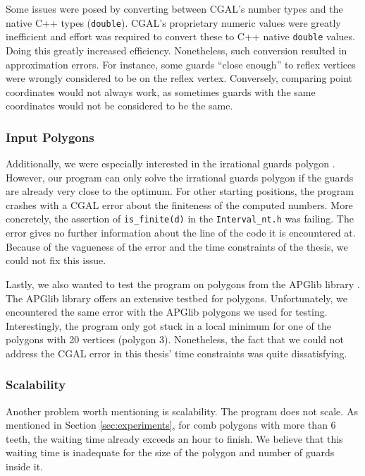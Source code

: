 Some issues were posed by converting between CGAL's number types and the native C++ types (\texttt{double}). CGAL's proprietary numeric values were greatly inefficient and effort was required to convert these to C++ native \texttt{double} values. Doing this greatly increased efficiency.
Nonetheless, such conversion resulted in approximation errors. For instance, some guards ``close enough'' to reflex vertices were wrongly considered to be on the reflex vertex. Conversely, comparing point coordinates would not always work, as sometimes guards with the same coordinates would not be considered to be the same.

\subsubsection*{Input Polygons}
Additionally, we were especially interested in the irrational guards polygon \cite{abrahamsen2021art}. However, our program can only solve the irrational guards polygon if the guards are already very close to the optimum. For other starting positions, the program crashes with a CGAL error about the finiteness of the computed numbers. More concretely, the assertion of \texttt{is\_finite(d)} in the \texttt{Interval\_nt.h} was failing. The error gives no further information about the line of the code it is encountered at. Because of the vagueness of the error and the time constraints of the thesis, we could not fix this issue.

Lastly, we also wanted to test the program on polygons from the APGlib library \cite{art-gallery-instances-page}. The APGlib library offers an extensive testbed for polygons. Unfortunately, we encountered the same error with the APGlib polygons we used for testing. Interestingly, the program only got stuck in a local minimum for one of the polygons with 20 vertices (polygon 3). Nonetheless, the fact that we could not address the CGAL error in this thesis' time constraints was quite dissatisfying.

\subsubsection*{Scalability}
Another problem worth mentioning is scalability. The program does not scale. As mentioned in Section \ref{sec:experiments}, for comb polygons with more than 6 teeth, the waiting time already exceeds an hour to finish. We believe that this waiting time is inadequate for the size of the polygon and number of guards inside it.

